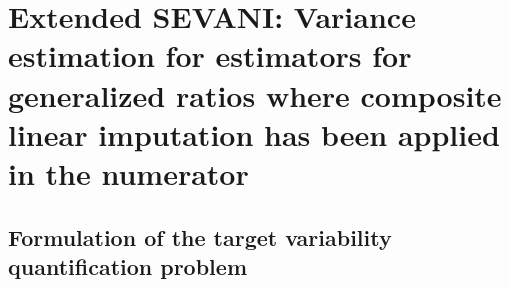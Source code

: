 

\section{Extended SEVANI: Variance estimation for estimators for {\color{red}generalized ratios} where composite linear imputation has been applied in the {\color{red}numerator}}
\label{DomainRatioSEVANI}


\subsection{Formulation of the target variability quantification problem}
\label{GeneralizedRatioFormulationOfVarianceEstimationProblem}
\setcounter{theorem}{0}


